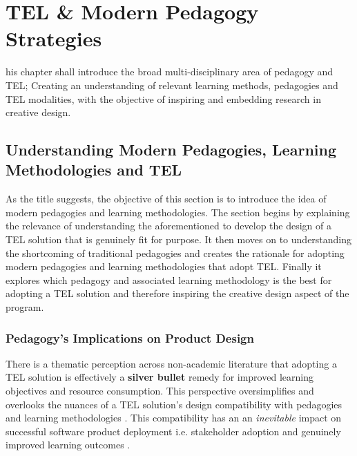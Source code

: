 %
%
\let\textcircled=\pgftextcircled
\chapter{TEL \& Modern Pedagogy Strategies}
\label{chap:TEL and Modern Pedagogical Strategies}


his chapter shall introduce the broad multi-disciplinary area of pedagogy and TEL; Creating an understanding of relevant learning methods, pedagogies and TEL modalities, with the objective of inspiring and embedding research in creative design.

\section{Understanding Modern Pedagogies, Learning Methodologies and TEL}

As the title suggests, the objective of this section is to introduce the idea of modern pedagogies and learning methodologies. The section begins by explaining the relevance of understanding the aforementioned to develop the design of a TEL solution that is genuinely fit for purpose. It then moves on to understanding the shortcoming of traditional pedagogies and creates the rationale for adopting modern pedagogies and learning methodologies that adopt TEL. Finally it explores which pedagogy and associated learning methodology is the best for adopting a TEL solution and therefore inspiring the creative design aspect of the program.

\label{sec:sec01}
\subsection{Pedagogy's Implications on Product Design}
\label{subsec:subsec01}

There is a thematic perception across non-academic literature that adopting a TEL solution is effectively a \textbf{silver bullet} remedy for improved learning objectives and resource consumption. This perspective oversimplifies and overlooks the nuances of a TEL solution's design compatibility with pedagogies and learning methodologies \cite{RickReis,Means2009,Team2008,Gordon2014,Burge2011}. This compatibility has an an \textit{inevitable} impact on successful software product deployment i.e. stakeholder adoption \cite{Mahamuni2015} and genuinely improved learning outcomes \cite{RickReis,Means2009,Team2008}.

